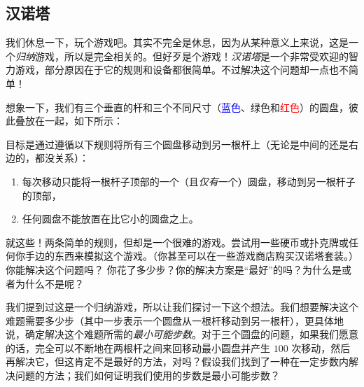 \subsection{汉诺塔}

我们休息一下，玩个游戏吧。其实不完全是休息，因为从某种意义上来说，这是一个\emph{归纳}游戏，所以是完全相关的。但好歹是个游戏！\emph{汉诺塔}是一个非常受欢迎的智力游戏，部分原因在于它的规则和设备都很简单。不过解决这个问题却一点也不简单！

想象一下，我们有三个垂直的杆和三个不同尺寸（\textcolor{blue}{蓝色}、\textcolor{olivegreen}{绿色}和\textcolor{red}{红色}）的圆盘，彼此叠放在一起，如下所示：

\begin{center}
\end{center}
目标是通过遵循以下规则将所有三个圆盘移动到另一根杆上（无论是中间的还是右边的，都没关系）：

\begin{enumerate}
    \item 每次移动只能将一根杆子顶部的一个（且\emph{仅有}一个）圆盘，移动到另一根杆子的顶部，
    \item 任何圆盘不能放置在比它小的圆盘之上。
\end{enumerate}
就这些！两条简单的规则，但却是一个很难的游戏。尝试用一些硬币或扑克牌或任何你手边的东西来模拟这个游戏。（你甚至可以在一些游戏商店购买汉诺塔套装。）你能解决这个问题吗？ 你花了多少步？你的解决方案是``最好''的吗？为什么是或者为什么不是呢？

我们提到过这是一个归纳游戏，所以让我们探讨一下这个想法。我们想要解决这个难题需要多少步（其中一步表示一个圆盘从一根杆移动到另一根杆），更具体地说，确定解决这个难题所需的\emph{最小可能步数}。对于三个圆盘的问题，如果我们愿意的话，完全可以不断地在两根杆之间来回移动最小圆盘并产生 $100$ 次移动，然后再解决它，但这肯定不是最好的方法，对吗？假设我们找到了一种在一定步数内解决问题的方法；我们如何证明我们使用的步数是最小可能步数？

